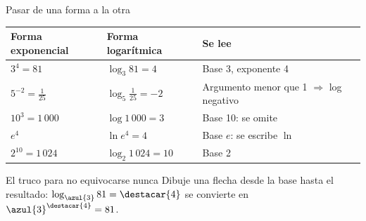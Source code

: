 \documentclass[aspectratio=169,10pt]{beamer}
\begin{document}
\begin{frame}{Pasar de una forma a la otra}
  \scriptsize
  \begin{center}
  \begin{tabular}{@{}p{4.2cm}p{4.2cm}p{3.6cm}@{}}
    \toprule
    \textbf{Forma exponencial} & \textbf{Forma logarítmica} &
    \textbf{Se lee} \\
    \midrule
    $3^{4} = 81$ & $\log_{3}81 = 4$ & Base 3, exponente 4 \\
    $5^{-2} = \tfrac{1}{25}$ & $\log_{5}\tfrac{1}{25} = -2$ &
      Argumento menor que 1 $\Rightarrow$ log negativo \\
    $10^{3} = 1\,000$ & $\log 1\,000 = 3$ & Base 10: se omite \\
    $e^{4}$ & $\ln e^{4} = 4$ & Base $e$: se escribe $\ln$ \\
    $2^{10} = 1\,024$ & $\log_{2}1\,024 = 10$ & Base 2 \\
    \bottomrule
  \end{tabular}
  \end{center}

  \vspace{0.1cm}
  \begin{alertblock}{El truco para no equivocarse nunca}
    \scriptsize
     Dibuje una flecha desde la base hasta el
    resultado: $\log_{\azul{3}}81 = \destacar{4}$ se convierte en
    $\azul{3}^{\destacar{4}} = 81$.
  \end{alertblock}
\end{frame}
\end{document}
